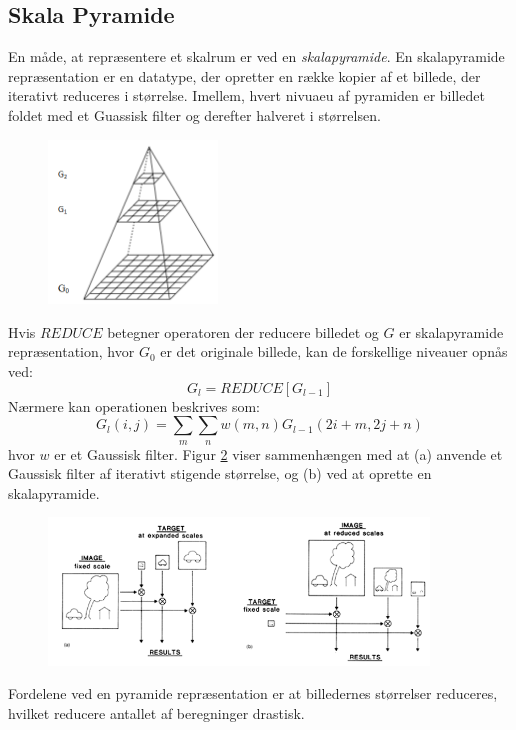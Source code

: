 \subsection{Skala Pyramide}
En måde, at repræsentere et skalrum er ved en \textit{skalapyramide}. En skalapyramide repræsentation er en datatype, der opretter en række kopier af et billede, der iterativt reduceres i størrelse. Imellem, hvert nivuaeu af pyramiden er billedet foldet med et Guassisk filter og derefter halveret i størrelsen.
\begin{figure}[H]
    \centering
    \includegraphics[width=0.40\textwidth]{fig/40.png}
     \vspace{-1em}
    \begin{center}    
       \caption{\textcolor{gray}{\footnotesize \textit{ }}}
    \label{fig:scalerepdiff}
     \end{center}
     \vspace{-2.5em}
  \end{figure} \noindent
Hvis $REDUCE$ betegner operatoren der reducere billedet og $G$ er skalapyramide repræsentation, hvor $G_0$ er det originale billede, kan de forskellige niveauer opnås ved:
\begin{equation}
G_l =REDUCE[G_{l-1}]
\end{equation}
Nærmere kan operationen beskrives som:
\begin{equation}
G_l(i,j)=\sum\limits_{m}\sum\limits_{n}w(m,n)G_{l-1}(2i+m,2j+n)
\end{equation}
hvor $w$ er et Gaussisk filter. Figur \ref{fig:scalerepdiff} viser sammenhængen med at (a) anvende et Gaussisk filter af iterativt stigende størrelse, og (b) ved at oprette en skalapyramide.
\begin{figure}[H]
    \centering
    \includegraphics[width=0.90\textwidth]{fig/38.png}
     \vspace{-1em}
    \begin{center}    
       \caption{\textcolor{gray}{\footnotesize \textit{ }}}
    \label{fig:scalerepdiff}
     \end{center}
     \vspace{-2.5em}
  \end{figure} \noindent
Fordelene ved en pyramide repræsentation er at  billedernes størrelser reduceres, hvilket reducere antallet af beregninger drastisk.